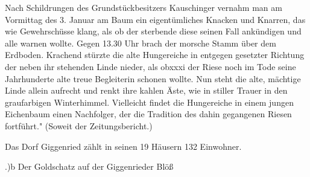 Nach Schildrungen des Grundstückbesitzers Kauschinger vernahm man am Vormittag
des 3. Januar am Baum ein eigentümliches Knacken und Knarren, das wie
Gewehrschüsse klang, als ob der sterbende diese seinen Fall ankündigen und alle
warnen wollte. Gegen 13.30 Uhr brach der morsche Stamm über dem Erdboden.
Krachend stürzte die alte Hungereiche in entgegen gesetzter Richtung der neben
ihr stehenden Linde nieder, als obxxxi der Riese noch im Tode seine Jahrhunderte
alte treue Begleiterin schonen wollte. Nun steht die alte, mächtige Linde allein
aufrecht und renkt ihre kahlen Äste, wie in stiller Trauer in den graufarbigen
Winterhimmel. Vielleicht findet die Hungereiche in einem jungen Eichenbaum einen
Nachfolger, der die Tradition des dahin gegangenen Riesen fortführt." (Soweit
der Zeitungsbericht.)

Das Dorf Giggenried zählt in seinen 19 Häusern 132 Einwohner.

.)b Der Goldschatz auf der Giggenrieder Blöß

